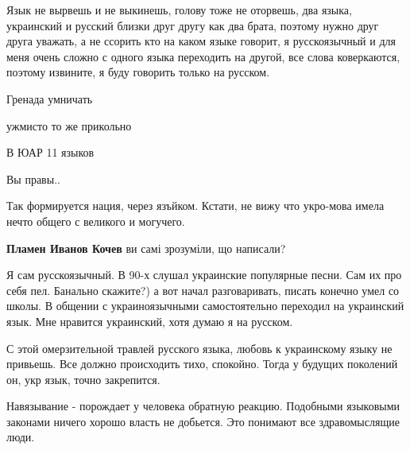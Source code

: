 \begin{itemize}
\begin{itemize}
\end{itemize}


Язык не вырвешь и не выкинешь, голову тоже не оторвешь, два языка, украинский и
русский близки друг другу как два брата, поэтому нужно друг друга уважать, а не
ссорить кто на каком языке говорит, я русскоязычный и для меня очень сложно с
одного языка переходить на другой, все слова коверкаются, поэтому извините, я
буду говорить только на русском.


Гренада умничать

ужмисто то же прикольно

В ЮАР 11 языков

Вы правы..


Так формируется нация, через язъйком. Кстати, не вижу что укро-мова имела нечто
общего с великого и могучего.

\begin{itemize}
\textbf{Пламен Иванов Кочев} ви самі зрозуміли, що написали?
\end{itemize}


Я сам русскоязычный. В 90-х слушал украинские популярные песни. Сам их про себя
пел. Банально скажите?) а вот начал разговаривать, писать конечно умел со
школы. В общении с украиноязычными самостоятельно переходил на украинский язык.
Мне нравится украинский, хотя думаю я на русском.

С этой омерзительной травлей русского языка, любовь к украинскому языку не
привьешь. Все должно происходить тихо, спокойно. Тогда у будущих поколений он,
укр язык, точно закрепится.

Навязывание - порождает у человека обратную реакцию. Подобными языковыми
законами ничего хорошо власть не добьется. Это понимают все здравомыслящие
люди.


\end{itemize}
